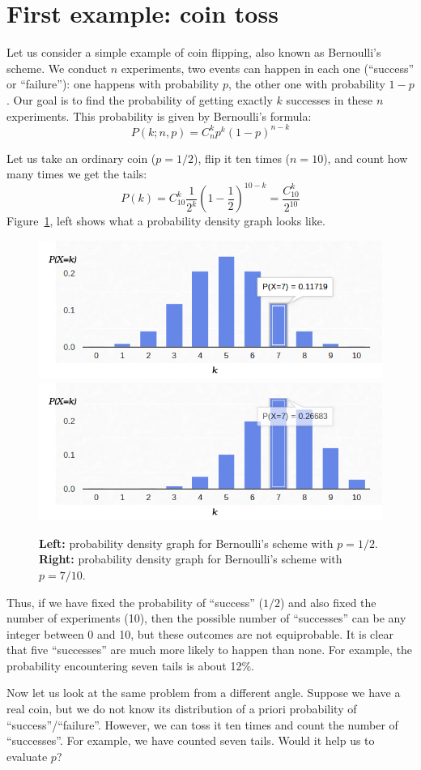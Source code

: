 \documentclass[notitlepage,oneside]{book}
\begin{document}
\section{First example: coin toss}
\label{sec:cointoss}
Let us consider a simple example of coin flipping, also known as Bernoulli's scheme. 
We conduct $n$ experiments, two events can happen in each one (``success'' or ``failure''): 
one happens with probability $p$, the other one with probability $1-p$. 
Our goal is to find the probability of getting exactly $k$ successes in these $n$ experiments. 
This probability is given by Bernoulli's formula:
$$
P(k;n,p) = C_n^k p^k (1-p)^{n-k}
$$

Let us take an ordinary coin ($p=1/2$), flip it ten times ($n=10$), and count how many times we get the tails:
$$P(k) = C_{10}^k \frac{1}{2^k}\left(1-\frac{1}{2}\right)^{10-k} = \frac{C_{10}^k}{2^{10}}$$
Figure~\ref{fig:binomial}, left shows what a probability density graph looks like.

\begin{figure}[htb!]
\centering
\includegraphics[width=.48\columnwidth]{img/binomial-05.png}
\includegraphics[width=.48\columnwidth]{img/binomial-07.png}
\caption{\textbf{Left:} probability density graph for Bernoulli's scheme with $p=1/2$. \textbf{Right:} probability density graph for Bernoulli's scheme with $p=7/10$.}
\label{fig:binomial}
\end{figure}

Thus, if we have fixed the probability of ``success'' ($1/2$) and also fixed the number of experiments (10), 
then the possible number of ``successes'' can be any integer between 0 and 10, but these outcomes are not equiprobable. 
It is clear that five ``successes'' are much more likely to happen than none. For example, the probability encountering seven tails is about 12\%.

Now let us look at the same problem from a different angle. 
Suppose we have a real coin, but we do not know its distribution of a priori probability of ``success''/``failure''. 
However, we can toss it ten times and count the number of ``successes''. 
For example, we have counted seven tails.
Would it help us to evaluate $p$?
\end{document}
